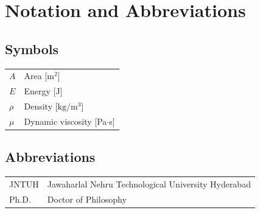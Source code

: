 \chapter*{Notation and Abbreviations}
\thispagestyle{plain}
\section*{Symbols}

\begin{tabular}{ll}
    $A$           & Area [$\mathrm{m^2}$]          \\
    $E$           & Energy [J]                     \\
    $\rho$        & Density [$\mathrm{kg/m^3}$]    \\
    $\mu$         & Dynamic viscosity [Pa$\cdot$s] \\
\end{tabular}

\vspace{1cm}
\section*{Abbreviations}

\begin{tabular}{ll}
    JNTUH & Jawaharlal Nehru Technological University Hyderabad \\
    Ph.D. & Doctor of Philosophy                                 \\
\end{tabular}

\newpage
